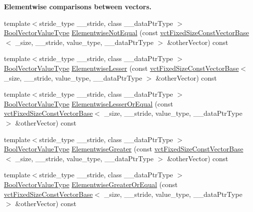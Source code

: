 \begin{Indent}{\bf Elementwise comparisons between vectors.}
\begin{DoxyCompactItemize}
\item 
{\footnotesize template$<$stride\+\_\+type \+\_\+\+\_\+stride, class \+\_\+\+\_\+data\+Ptr\+Type $>$ }\\\hyperlink{classvct_fixed_size_const_vector_base_a15899465a75a2f78965bdcf2d6e34bc5}{Bool\+Vector\+Value\+Type} \hyperlink{classvct_fixed_size_const_vector_base_affd4520d21b356049664b7b696c73e51}{Elementwise\+Not\+Equal} (const \hyperlink{classvct_fixed_size_const_vector_base}{vct\+Fixed\+Size\+Const\+Vector\+Base}$<$ \+\_\+size, \+\_\+\+\_\+stride, value\+\_\+type, \+\_\+\+\_\+data\+Ptr\+Type $>$ \&other\+Vector) const 
\item 
{\footnotesize template$<$stride\+\_\+type \+\_\+\+\_\+stride, class \+\_\+\+\_\+data\+Ptr\+Type $>$ }\\\hyperlink{classvct_fixed_size_const_vector_base_a15899465a75a2f78965bdcf2d6e34bc5}{Bool\+Vector\+Value\+Type} \hyperlink{classvct_fixed_size_const_vector_base_a6858554efb3024dcac960994b3762eed}{Elementwise\+Lesser} (const \hyperlink{classvct_fixed_size_const_vector_base}{vct\+Fixed\+Size\+Const\+Vector\+Base}$<$ \+\_\+size, \+\_\+\+\_\+stride, value\+\_\+type, \+\_\+\+\_\+data\+Ptr\+Type $>$ \&other\+Vector) const 
\item 
{\footnotesize template$<$stride\+\_\+type \+\_\+\+\_\+stride, class \+\_\+\+\_\+data\+Ptr\+Type $>$ }\\\hyperlink{classvct_fixed_size_const_vector_base_a15899465a75a2f78965bdcf2d6e34bc5}{Bool\+Vector\+Value\+Type} \hyperlink{classvct_fixed_size_const_vector_base_a09107ff818ef0b09a8012db430a1be32}{Elementwise\+Lesser\+Or\+Equal} (const \hyperlink{classvct_fixed_size_const_vector_base}{vct\+Fixed\+Size\+Const\+Vector\+Base}$<$ \+\_\+size, \+\_\+\+\_\+stride, value\+\_\+type, \+\_\+\+\_\+data\+Ptr\+Type $>$ \&other\+Vector) const 
\item 
{\footnotesize template$<$stride\+\_\+type \+\_\+\+\_\+stride, class \+\_\+\+\_\+data\+Ptr\+Type $>$ }\\\hyperlink{classvct_fixed_size_const_vector_base_a15899465a75a2f78965bdcf2d6e34bc5}{Bool\+Vector\+Value\+Type} \hyperlink{classvct_fixed_size_const_vector_base_aecfe9c83072108ad25e703d123308bda}{Elementwise\+Greater} (const \hyperlink{classvct_fixed_size_const_vector_base}{vct\+Fixed\+Size\+Const\+Vector\+Base}$<$ \+\_\+size, \+\_\+\+\_\+stride, value\+\_\+type, \+\_\+\+\_\+data\+Ptr\+Type $>$ \&other\+Vector) const 
\item 
{\footnotesize template$<$stride\+\_\+type \+\_\+\+\_\+stride, class \+\_\+\+\_\+data\+Ptr\+Type $>$ }\\\hyperlink{classvct_fixed_size_const_vector_base_a15899465a75a2f78965bdcf2d6e34bc5}{Bool\+Vector\+Value\+Type} \hyperlink{classvct_fixed_size_const_vector_base_a5c06998807817166a95ecb4c39672a45}{Elementwise\+Greater\+Or\+Equal} (const \hyperlink{classvct_fixed_size_const_vector_base}{vct\+Fixed\+Size\+Const\+Vector\+Base}$<$ \+\_\+size, \+\_\+\+\_\+stride, value\+\_\+type, \+\_\+\+\_\+data\+Ptr\+Type $>$ \&other\+Vector) const 
\end{DoxyCompactItemize}
\end{Indent}
